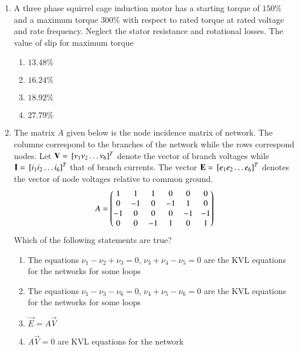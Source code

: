 \documentclass[journal]{IEEEtran}
\numberwithin{equation}{enumi}
\numberwithin{figure}{enumi}
\begin{document}
\begin{enumerate}
    \item 
    A three phase squirrel cage induction motor has a starting torque of $150\%$ and a maximum torque $300\%$ with respect to rated torque at rated voltage and rate frequency. Neglect the stator resistance and rotational losses. The value of slip for maximum torque
    \hfill{}
    \begin{multicols}{4}
        \begin{enumerate}
            \item $13.48\%$
            \item $16.24\%$
            \item $18.92\%$
            \item $27.79\%$
        \end{enumerate}
    \end{multicols}

    \item 
    The matrix $A$ given below is the node incidence matrix of  network. The columns correspond to the branches of the network while the rows correspond nodes. Let $\mathbf{V} = {}\left[\nu_1 \nu_2 \dots \nu_6\right]^T$ denote the vector of branch voltages while $\mathbf{I} = {}\left[i_1 i_2 \dots i_6\right]^T$ that of branch currents. The vector $\mathbf{E} = {}\left[e_1 e_2 \dots e_6\right]^T$ denotes the vector of node voltages relative to common ground. 
    \begin{align*}
        A = \begin{pmatrix}1 & 1 & 1 & 0 & 0 & 0 \\ 0 & -1 & 0 & -1 & 1 & 0 \\ -1 & 0 & 0 & 0 & -1 & -1\\ 0 & 0 & -1 & 1 & 0 & 1\end{pmatrix}
    \end{align*}
    Which of the following statements are true?
    \hfill{}
    \begin{enumerate}
        \item The equations $\nu_1 - \nu_2 + \nu_3 = 0$, $\nu_3 + \nu_4 - \nu_5 = 0$ are the KVL equations for the networks for some loops 
        \item The equations $\nu_1 - \nu_3 - \nu_6 = 0$, $\nu_4 + \nu_5 - \nu_6 = 0$ are the KVL equations for the networks for some loops
        \item $\vec{E} = A\vec{V}$
        \item $A\vec{V} = 0$ are KVL equations for the network
    \end{enumerate}


\end{enumerate}
\end{document}
